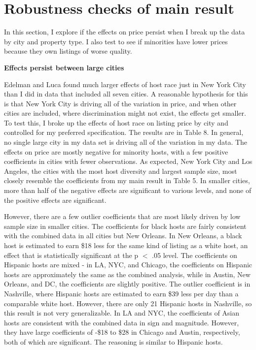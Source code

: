 \section{Robustness checks of main result} 

In this section, I explore if the effects on price persist when I break up the data by city and property type. I also test to see if minorities have lower prices because they own listings of worse quality. 

\textbf{Effects persist between large cities}

Edelman and Luca found much larger effects of host race just in New York City than I did in data that included all seven cities. A reasonable hypothesis for this is that New York City is driving all of the variation in price, and when other cities are included, where discrimination might not exist, the effects get smaller. To test this, I broke up the effects of host race on listing price by city and controlled for my preferred specification. The results are in Table 8. In general, no single large city in my data set is driving all of the variation in my data. The effects on price are mostly negative for minority hosts, with a few positive coefficients in cities with fewer observations. As expected, New York City and Los Angeles, the cities with the most host diversity and largest sample size, most closely resemble the coefficients from my main result in Table 5. In smaller cities, more than half of the negative effects are significant to various levels, and none of the positive effects are significant. 

However, there are a few outlier coefficients that are most likely driven by low sample size in smaller cities. The coefficients for black hosts are fairly consistent with the combined data in all cities but New Orleans. In New Orleans, a black host is estimated to earn \$18 less for the same kind of listing as a white host, an effect that is statistically significant at the p $<$ .05 level. The coefficients on Hispanic hosts are mixed - in LA, NYC, and Chicago, the coefficients on Hispanic hosts are approximately the same as the combined analysis, while in Austin, New Orleans, and DC, the coefficients are slightly positive. The outlier coefficient is in Nashville, where Hispanic hosts are estimated to earn \$39 less per day than a comparable white host. However, there are only 21 Hispanic hosts in Nashville, so this result is not very generalizable. In LA and NYC, the coefficients of Asian hosts are consistent with the combined data in sign and magnitude. However, they have large coefficients of -\$18 to \$28 in Chicago and Austin, respectively, both of which are significant. The reasoning is similar to Hispanic hosts. 

